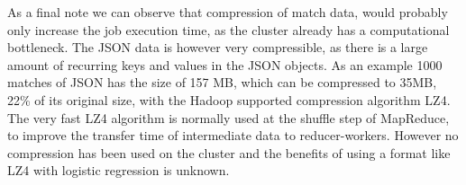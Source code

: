 As a final note we can observe that compression of match data, would probably only increase the job execution time, as the cluster already has a computational bottleneck. The JSON data is however very compressible, as there is a large amount of recurring keys and values in the JSON objects. As an example 1000 matches of JSON has the size of 157 MB, which can be compressed to 35MB, 22\% of its original size, with the Hadoop supported compression algorithm LZ4. The very fast LZ4 algorithm is normally used at the shuffle step of MapReduce, to improve the transfer time of intermediate data to reducer-workers. However no compression has been used on the cluster and the benefits of using a format like LZ4 with logistic regression is unknown.




